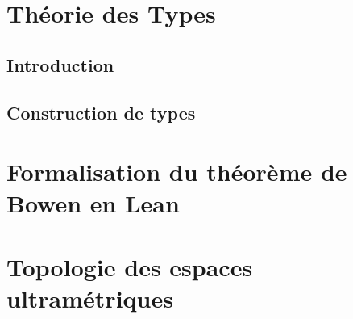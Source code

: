 \documentclass[a4paper, 11pt]{article}
\title{\Title}
\author{\Author}
\date{\today}
\begin{document}
  \maketitle
  \tableofcontents
  \pagebreak

  \section{Théorie des Types}
    \subsection{Introduction}
      


    \subsection{Construction de types}
      

  \section{Formalisation du théorème de Bowen en Lean}
    

  \section{Topologie des espaces ultramétriques}
    

\end{document}
